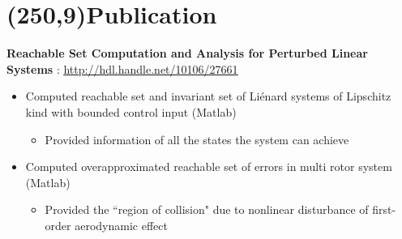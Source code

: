 \documentclass[10pt,a4paper]{extarticle}
\begin{document}
\section*{\colorbox{gray!10}{\makebox(250,9){\textcolor{blue!65}{Publication\hfill}}}}
\textbf{Reachable Set Computation and Analysis for Perturbed Linear Systems} : \href{http://hdl.handle.net/10106/27661}{\ul{http://hdl.handle.net/10106/27661}}
\vspace{-0.6em}
\begin{itemize}[leftmargin = 0.6cm]
\setlength\itemsep{-0.2em}
\item Computed reachable set and invariant set of Li\'enard systems of Lipschitz kind with bounded control input (Matlab)
\vspace{-0.6em}
\begin{itemize}[leftmargin = 0.3cm]
\setlength\itemsep{-0.2em}
\item Provided information of all the states the system can achieve
\end{itemize}
\item Computed overapproximated reachable set of errors in multi rotor system (Matlab)
\vspace{-0.6em}
\begin{itemize}[leftmargin = 0.3cm]
\setlength\itemsep{-0.2em}
\item Provided the ``region of collision" due to nonlinear disturbance of first-order aerodynamic effect
\end{itemize}
\end{itemize}
\vspace{-0.2cm}
\end{document}
